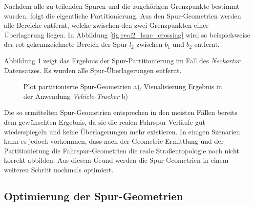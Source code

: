 Nachdem alle zu teilenden Spuren und die zugehörigen Grenzpunkte
bestimmt wurden, folgt die eigentliche Partitionierung. Aus den Spur-Geometrien werden alle Bereiche
entfernt, welche zwischen den zwei Grenzpunkten einer Überlagerung liegen. In Abbildung \ref{fig:real2_lane_crossing}
wird so beispielsweise der rot gekennzeichnete Bereich der Spur $l_2$ zwischen $b_1$ und $b_2$ entfernt.

Abbildung \ref{fig:real2_results_partitioning} zeigt das Ergebnis der Spur-Partitionierung im Fall des
\textit{Neckartor} Datensatzes. Es wurden alle Spur-Überlagerungen entfernt.

\begin{figure}[H]
    \centering
    \qquad
    \caption[Ergebnisse Spur-Partitionierung]
            {Plot partitionierte Spur-Geometrien a), Visualisierung Ergebnis in der Anwendung \textit{Vehicle-Tracker} b)}
    \label{fig:real2_results_partitioning}
\end{figure}

Die so ermittelten Spur-Geometrien entsprechen in den meisten Fällen bereits dem gewünschten Ergebnis,
da sie die realen Fahrspur-Verläufe gut wiederspiegeln und keine Überlagerungen mehr existieren.
In einigen Szenarien kann es jedoch vorkommen, dass nach der Geometrie-Ermittlung und der Partitionierung
die Fahrspur-Geometrien die reale Straßentopologie noch nicht korrekt abbilden. Aus diesem Grund werden die
Spur-Geometrien in einem weiteren Schritt nochmals optimiert.

\subsection{Optimierung der Spur-Geometrien}
\label{sec:real2_lane_geo_opt}

